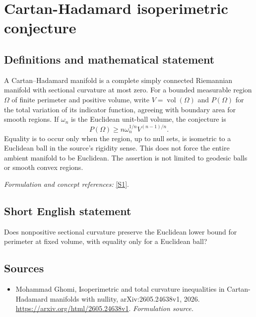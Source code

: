 \documentclass[11pt]{article}
\begin{document}
\section*{\texorpdfstring{Cartan-Hadamard isoperimetric conjecture}{Cartan-Hadamard isoperimetric conjecture}}\label{274}
\subsection{Definitions and mathematical statement}
A Cartan--Hadamard manifold is a complete simply connected Riemannian manifold with sectional curvature at most zero. For a bounded measurable region $\Omega$ of finite perimeter and positive volume, write $V=\operatorname{vol}(\Omega)$ and $P(\Omega)$ for the total variation of its indicator function, agreeing with boundary area for smooth regions. If $\omega_n$ is the Euclidean unit-ball volume, the conjecture is
\[
 P(\Omega)\ge n\omega_n^{1/n}V^{(n-1)/n}.
\]
Equality is to occur only when the region, up to null sets, is isometric to a Euclidean ball in the source's rigidity sense. This does not force the entire ambient manifold to be Euclidean. The assertion is not limited to geodesic balls or smooth convex regions.
\par\smallskip\textit{Formulation and concept references:} \href{https://arxiv.org/html/2605.24638v1}{[S1]}.

\subsection{Short English statement}
Does nonpositive sectional curvature preserve the Euclidean lower bound for perimeter at fixed volume, with equality only for a Euclidean ball?
\subsection{Sources}
\begin{itemize}
\item[S1]Mohammad Ghomi, Isoperimetric and total curvature inequalities in Cartan-Hadamard manifolds with nullity, arXiv:2605.24638v1, 2026.
\url{https://arxiv.org/html/2605.24638v1}.
\textit{Formulation source.}
\end{itemize}
\end{document}
